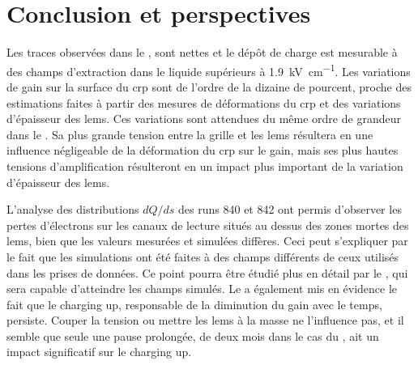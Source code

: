  \section{Conclusion et perspectives}

    Les traces observées dans le \TOO{}, sont nettes et le dépôt de charge est mesurable à des champs d'extraction dans le liquide supérieurs à \SI{1.9}{\kilo\volt\per\centi\meter}. Les variations de gain sur la surface du \gls{crp} sont de l'ordre de la dizaine de pourcent, proche des estimations faites à partir des mesures de déformations du \gls{crp} et des variations d'épaisseur des \glspl{lem}. Ces variations sont attendues du même ordre de grandeur dans le \SSS{}. Sa plus grande tension entre la grille et les \glspl{lem} résultera en une influence négligeable de la déformation du \gls{crp} sur le gain, mais ses plus hautes tensions d'amplification résulteront en un impact plus important de la variation d'épaisseur des \glspl{lem}.

    L'analyse des distributions $dQ/ds$ des runs 840 et 842 ont permis d'observer les pertes d'électrons sur les canaux de lecture situés au dessus des zones mortes des \glspl{lem}, bien que les valeurs mesurées et simulées diffères. Ceci peut s'expliquer par le fait que les simulations ont été faites à des champs différents de ceux utilisés dans les prises de données. Ce point pourra être étudié plus en détail par le \SSS{}, qui sera capable d'atteindre les champs simulés. Le \TOO{} a également mis en évidence le fait que le charging up, responsable de la diminution du gain avec le temps, persiste. Couper la tension ou mettre les \glspl{lem} à la masse ne l'influence pas, et il semble que seule une pause prolongée, de deux mois dans le cas du \TOO{}, ait un impact significatif sur le charging up.

\FloatBarrier

\printbibliography